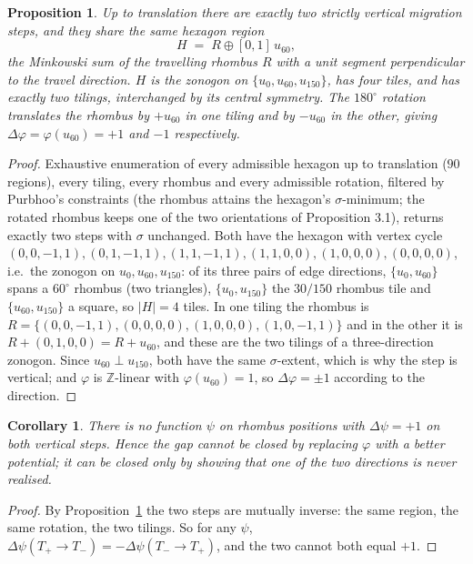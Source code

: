 \documentclass[11pt]{article}
\theoremstyle{plain}
\newtheorem{proposition}[theorem]{Proposition}
\newtheorem{corollary}[theorem]{Corollary}
\theoremstyle{definition}
\begin{document}
\begin{proposition}\label{prop:slide}
Up to translation there are exactly two strictly vertical migration steps, and
they share the same hexagon region
\[
   H \;=\; R \oplus [0,1]\,u_{60},
\]
the Minkowski sum of the travelling rhombus $R$ with a unit segment
perpendicular to the travel direction.  $H$ is the zonogon on
$\{u_0,u_{60},u_{150}\}$, has four tiles, and has exactly two tilings,
interchanged by its central symmetry.  The $180^\circ$ rotation translates the
rhombus by $+u_{60}$ in one tiling and by $-u_{60}$ in the other, giving
$\Delta\varphi=\varphi(u_{60})=+1$ and $-1$ respectively.
\end{proposition}

\begin{proof}
Exhaustive enumeration of every admissible hexagon up to translation ($90$
regions), every tiling, every rhombus and every admissible rotation, filtered by
Purbhoo's constraints (the rhombus attains the hexagon's $\sigma$-minimum; the
rotated rhombus keeps one of the two orientations of Proposition 3.1), returns
exactly two steps with $\sigma$ unchanged.  Both have the hexagon with vertex
cycle $(0,0,-1,1),(0,1,-1,1),(1,1,-1,1),(1,1,0,0),(1,0,0,0),(0,0,0,0)$, i.e.\ the
zonogon on $u_0,u_{60},u_{150}$: of its three pairs of edge directions,
$\{u_0,u_{60}\}$ spans a $60^\circ$ rhombus (two triangles), $\{u_0,u_{150}\}$
the $30/150$ rhombus tile and $\{u_{60},u_{150}\}$ a square, so $|H|=4$ tiles.
In one tiling the rhombus is $R=\{(0,0,-1,1),(0,0,0,0),(1,0,0,0),(1,0,-1,1)\}$
and in the other it is $R+(0,1,0,0)=R+u_{60}$, and these are the two tilings of a
three-direction zonogon.  Since $u_{60}\perp u_{150}$, both have the same
$\sigma$-extent, which is why the step is vertical; and
$\varphi$ is $\mathbb{Z}$-linear with $\varphi(u_{60})=1$, so
$\Delta\varphi=\pm1$ according to the direction.
\end{proof}

\begin{corollary}\label{cor:irred}
There is no function $\psi$ on rhombus positions with $\Delta\psi=+1$ on both
vertical steps.  Hence the gap cannot be closed by replacing $\varphi$ with a
better potential; it can be closed only by showing that one of the two
directions is never realised.
\end{corollary}

\begin{proof}
By Proposition~\ref{prop:slide} the two steps are mutually inverse: the same
region, the same rotation, the two tilings.  So for any $\psi$,
$\Delta\psi(T_+\!\to\!T_-)=-\Delta\psi(T_-\!\to\!T_+)$, and the two cannot both
equal $+1$.
\end{proof}
\end{document}

